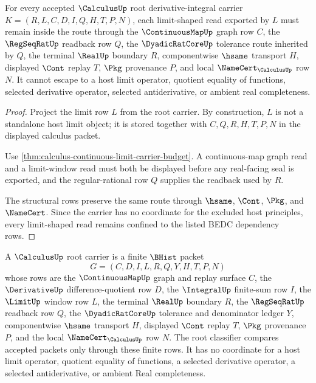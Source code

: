 \begin{theorem}
\label{thm:calculus-root-limit-nonescape}
For every accepted $\CalculusUp$ root derivative-integral carrier $K=(R,L,C,D,I,Q,H,T,P,N)$, each limit-shaped read exported by $L$ must remain inside the route through the $\ContinuousMapUp$ graph row $C$, the $\RegSeqRatUp$ readback row $Q$, the $\DyadicRatCoreUp$ tolerance route inherited by $Q$, the terminal $\RealUp$ boundary $R$, componentwise $\hsame$ transport $H$, displayed $\Cont$ replay $T$, $\Pkg$ provenance $P$, and local $\NameCert_{\CalculusUp}$ row $N$. It cannot escape to a host limit operator, quotient equality of functions, selected derivative operator, selected antiderivative, or ambient real completeness.
\end{theorem}
\begin{proof}
Project the limit row $L$ from the root carrier. By construction, $L$ is not a standalone host limit object; it is stored together with $C,Q,R,H,T,P,N$ in the displayed calculus packet.

Use \autoref{thm:calculus-continuous-limit-carrier-budget}. A continuous-map graph read and a limit-window read must both be displayed before any real-facing seal is exported, and the regular-rational row $Q$ supplies the readback used by $R$.

The structural rows preserve the same route through $\hsame$, $\Cont$, $\Pkg$, and $\NameCert$. Since the carrier has no coordinate for the excluded host principles, every limit-shaped read remains confined to the listed BEDC dependency rows.
\end{proof}

\begin{definition}
\label{def:calculus-root-carrier}
A $\CalculusUp$ root carrier is a finite $\BHist$ packet
$$
G=(C,D,I,L,R,Q,Y,H,T,P,N)
$$
whose rows are the $\ContinuousMapUp$ graph and replay surface $C$, the $\DerivativeUp$ difference-quotient row $D$, the $\IntegralUp$ finite-sum row $I$, the $\LimitUp$ window row $L$, the terminal $\RealUp$ boundary $R$, the $\RegSeqRatUp$ readback row $Q$, the $\DyadicRatCoreUp$ tolerance and denominator ledger $Y$, componentwise $\hsame$ transport $H$, displayed $\Cont$ replay $T$, $\Pkg$ provenance $P$, and the local $\NameCert_{\CalculusUp}$ row $N$. The root classifier compares accepted packets only through these finite rows. It has no coordinate for a host limit operator, quotient equality of functions, a selected derivative operator, a selected antiderivative, or ambient Real completeness.
\end{definition}

